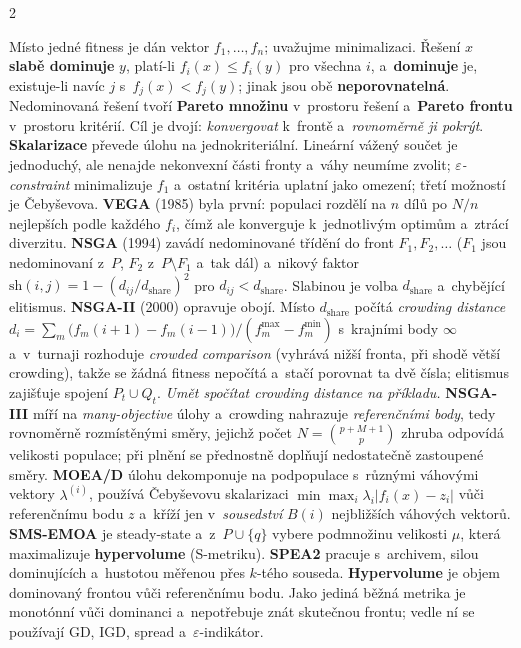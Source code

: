 \documentclass[10pt,a4paper]{article}
\newcommand{\hh}[1]{\par\smallskip\noindent{\bfseries\color{headcol}#1}\par\nobreak\vspace{-0.2em}}
\newcommand{\tm}[1]{\textbf{#1}}
\newcommand{\en}[1]{\emph{#1}}
\begin{document}
\begin{multicols}{2}
\hh{Vícekriteriální optimalizace}
Místo jedné fitness je dán vektor $f_1,\dots,f_n$; uvažujme minimalizaci. Řešení $x$ \tm{slabě
dominuje} $y$, platí-li $f_i(x)\le f_i(y)$ pro všechna $i$, a~\tm{dominuje} je, existuje-li
navíc $j$ s~$f_j(x)<f_j(y)$; jinak jsou obě \tm{neporovnatelná}.
Nedominovaná řešení tvoří \tm{Pareto množinu} v~prostoru řešení a~\tm{Pareto frontu} v~prostoru
kritérií. Cíl je dvojí: \emph{konvergovat} k~frontě a~\emph{rovnoměrně ji pokrýt}.
\tm{Skalarizace} převede úlohu na jednokriteriální. Lineární vážený součet je jednoduchý, ale
nenajde nekonvexní části fronty a~váhy neumíme zvolit; \emph{$\varepsilon$-constraint}
minimalizuje $f_1$ a~ostatní kritéria uplatní jako omezení; třetí možností je Čebyševova.
\tm{VEGA} (1985) byla první: populaci rozdělí na $n$ dílů po $N/n$ nejlepších podle každého
$f_i$, čímž ale konverguje k~jednotlivým optimům a~ztrácí diverzitu.
\tm{NSGA} (1994) zavádí nedominované třídění do front $F_1,F_2,\dots$ ($F_1$ jsou nedominovaní
z~$P$, $F_2$ z~$P\setminus F_1$ a~tak dál) a~nikový faktor
$\mathrm{sh}(i,j)=1-(d_{ij}/d_{\text{share}})^2$ pro $d_{ij}<d_{\text{share}}$. Slabinou je
volba $d_{\text{share}}$ a~chybějící elitismus.
\tm{NSGA-II} (2000) opravuje obojí. Místo $d_{\text{share}}$ počítá \emph{crowding distance}
$d_i=\sum_m\bigl(f_m(i{+}1)-f_m(i{-}1)\bigr)/(f_m^{\max}-f_m^{\min})$ s~krajními body $\infty$
a~v~turnaji rozhoduje \emph{crowded comparison} (vyhrává nižší fronta, při shodě větší
crowding), takže se žádná fitness nepočítá a~stačí porovnat ta dvě čísla; elitismus zajišťuje
spojení $P_t\cup Q_t$. \emph{Umět spočítat crowding distance na příkladu.}
\tm{NSGA-III} míří na \en{many-objective} úlohy a~crowding nahrazuje \emph{referenčními body},
tedy rovnoměrně rozmístěnými směry, jejichž počet $N=\binom{p+M+1}{p}$ zhruba odpovídá velikosti
populace; při plnění se přednostně doplňují nedostatečně zastoupené směry.
\tm{MOEA/D} úlohu dekomponuje na podpopulace s~různými váhovými vektory $\lambda^{(i)}$, používá
Čebyševovu skalarizaci $\min\max_i\lambda_i|f_i(x)-z_i|$ vůči referenčnímu bodu $z$ a~kříží jen
v~\emph{sousedství} $B(i)$ nejbližších váhových vektorů.
\tm{SMS-EMOA} je steady-state a~z~$P\cup\{q\}$ vybere podmnožinu velikosti $\mu$, která
maximalizuje \tm{hypervolume} (S-metriku). \tm{SPEA2} pracuje s~archivem, silou dominujících
a~hustotou měřenou přes $k$-tého souseda.
\tm{Hypervolume} je objem dominovaný frontou vůči referenčnímu bodu. Jako jediná běžná metrika
je monotónní vůči dominanci a~nepotřebuje znát skutečnou frontu; vedle ní se používají GD, IGD,
spread a~$\varepsilon$-indikátor.

\end{multicols}
\end{document}
